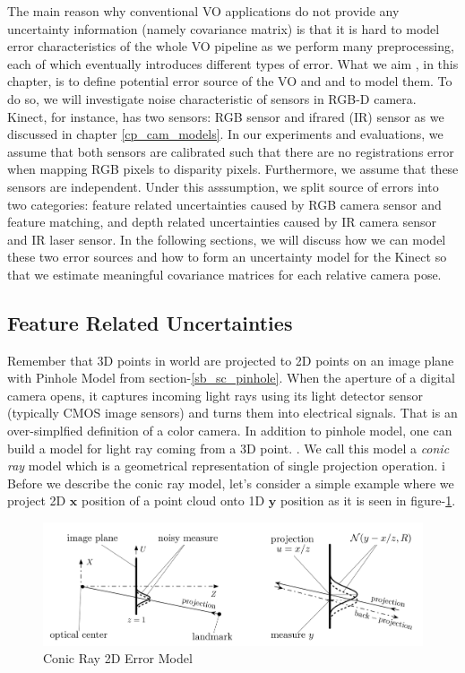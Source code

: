 \documentclass[a4paper]{report}
\numberwithin{figure}{section}
\begin{document}
The main reason why conventional VO applications do not provide any uncertainty 
information (namely covariance matrix) is that it is hard to model 
error characteristics of the whole VO pipeline as we perform many preprocessing, 
each of which eventually introduces different types of error. What we aim 
, in this chapter, is to define potential error source of the VO and 
and to model them. To do so, we will investigate noise characteristic of 
sensors in RGB-D camera. 
Kinect, for instance, has two sensors: RGB sensor 
and ifrared (IR) sensor as we discussed in chapter \ref{cp_cam_models}. 
In our experiments and evaluations,
we assume that both sensors are calibrated such that 
there are no registrations error when mapping RGB pixels to disparity pixels. 
Furthermore, 
we assume that these sensors are independent. Under this asssumption, 
we split source of errors into two categories: feature related uncertainties 
caused by RGB camera sensor and feature matching, 
and depth related uncertainties caused by 
IR camera sensor and IR laser sensor. 
In the following sections, we will discuss how we can model these 
two error sources and how to form an uncertainty model 
for the Kinect so that we estimate meaningful covariance matrices for each 
relative camera pose.

\subsection{Feature Related Uncertainties} \label{sb_sc_pixel_uncertainty}

Remember that 3D points in world are projected to 2D points on an image plane with 
Pinhole Model from section-\ref{sb_sc_pinhole}. When the aperture of a digital 
camera opens, it captures incoming light rays using its light detector sensor 
(typically CMOS image sensors) and turns them into electrical signals. That 
is an over-simplfied definition of a color camera. In addition to pinhole 
model, one can build a model for light ray coming from a 3D point.
. We call this model 
a \textit{conic ray} model which is a geometrical representation of 
single projection operation. i
Before we describe the conic ray model, let's consider a simple example where we 
project 2D $\mathbf{x}$ position of a point cloud onto 1D $\mathbf{y}$ position
as it is seen in figure-\ref{fig:conic_ray_2d_error_model}.


\begin{figure}[H]
	\centering
  \includegraphics[width=0.7\linewidth,natwidth=640,natheight=640]
  {fig/ref_imgs/conic_ray_2d_model.png}
  \caption{Conic Ray 2D Error Model}
	\label{fig:conic_ray_2d_error_model}
\end{figure}
\end{document}

